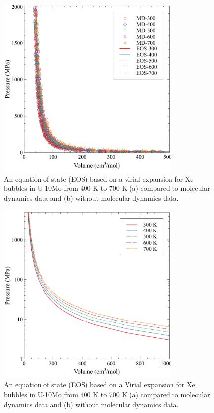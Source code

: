\documentclass[review]{elsarticle}
\begin{document}
\begin{figure}[h!]
 \centering
 \includegraphics[width=0.8\textwidth]{MD_Virial.pdf} 
 \caption{An equation of state (EOS) based on a virial expansion for Xe bubbles in U-10Mo from 400 K to 700 K (a) compared to molecular dynamics data and (b) without molecular dynamics data. }
 \label{fig:MD_Vir}
\end{figure}

\begin{figure}[h!]
 \centering
 \includegraphics[width=0.8\textwidth]{virial_fit.pdf} 
 \caption{An equation of state (EOS) based on a Virial expansion for Xe bubbles in U-10Mo from 400 K to 700 K (a) compared to molecular dynamics data and (b) without molecular dynamics data. }
 \label{fig:Vir}
\end{figure}
\end{document}
